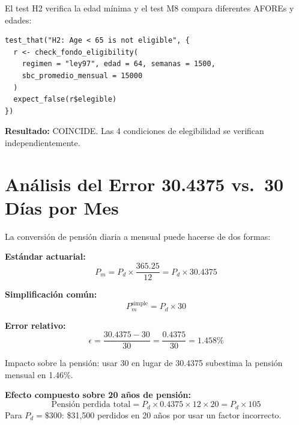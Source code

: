 \documentclass[11pt,a4paper]{report}
\begin{document}
\begin{tcolorbox}[colback=orange!5!white, colframe=orange!75!black, title=\textbf{Aplicaci\'on en C\'odigo: Verificaci\'on}]
El test H2 verifica la edad m\'inima y el test M8 compara diferentes AFOREs y edades:

\begin{lstlisting}
test_that("H2: Age < 65 is not eligible", {
  r <- check_fondo_eligibility(
    regimen = "ley97", edad = 64, semanas = 1500,
    sbc_promedio_mensual = 15000
  )
  expect_false(r$elegible)
})
\end{lstlisting}

\textbf{Resultado:} COINCIDE. Las 4 condiciones de elegibilidad se verifican independientemente.
\end{tcolorbox}


\section{An\'alisis del Error 30.4375 vs.\ 30 D\'ias por Mes}

\begin{tcolorbox}[colback=blue!5!white, colframe=blue!75!black, title=\textbf{Definici\'on Formal: Error de Conversi\'on Diaria-Mensual}]
La conversi\'on de pensi\'on diaria a mensual puede hacerse de dos formas:

\textbf{Est\'andar actuarial:}
\[
  P_m = P_d \times \frac{365.25}{12} = P_d \times 30.4375
\]

\textbf{Simplificaci\'on com\'un:}
\[
  P_m^{\text{simple}} = P_d \times 30
\]

\textbf{Error relativo:}
\[
  \epsilon = \frac{30.4375 - 30}{30} = \frac{0.4375}{30} = 1.458\%
\]

Impacto sobre la pensi\'on: usar 30 en lugar de 30.4375 subestima la pensi\'on mensual en 1.46\%.

\textbf{Efecto compuesto sobre 20 a\~nos de pensi\'on:}
\[
  \text{Pensi\'on perdida total} = P_d \times 0.4375 \times 12 \times 20 = P_d \times 105
\]
Para $P_d = \$300$: \$31,500 perdidos en 20 a\~nos por usar un factor incorrecto.
\end{tcolorbox}
\end{document}

